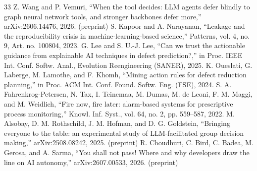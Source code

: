 \documentclass[conference]{IEEEtran}
\begin{document}
\begin{thebibliography}{33}
 Z. Wang and P. Vemuri, ``When the tool decides: LLM agents defer blindly to graph neural network tools, and stronger backbones defer more,'' arXiv:2606.14476, 2026. (preprint)
 S. Kapoor and A. Narayanan, ``Leakage and the reproducibility crisis in machine-learning-based science,'' Patterns, vol. 4, no. 9, Art. no. 100804, 2023.
 G. Lee and S. U.-J. Lee, ``Can we trust the actionable guidance from explainable AI techniques in defect prediction?,'' in Proc. IEEE Int. Conf. Softw. Anal., Evolution Reengineering (SANER), 2025.
 K. Oueslati, G. Laberge, M. Lamothe, and F. Khomh, ``Mining action rules for defect reduction planning,'' in Proc. ACM Int. Conf. Found. Softw. Eng. (FSE), 2024.
 S. A. Fahrenkrog-Petersen, N. Tax, I. Teinemaa, M. Dumas, M. de Leoni, F. M. Maggi, and M. Weidlich, ``Fire now, fire later: alarm-based systems for prescriptive process monitoring,'' Knowl. Inf. Syst., vol. 64, no. 2, pp. 559--587, 2022.
 M. Alsobay, D. M. Rothschild, J. M. Hofman, and D. G. Goldstein, ``Bringing everyone to the table: an experimental study of LLM-facilitated group decision making,'' arXiv:2508.08242, 2025. (preprint)
 R. Choudhuri, C. Bird, C. Badea, M. Gerosa, and A. Sarma, ``You shall not pass! Where and why developers draw the line on AI autonomy,'' arXiv:2607.00533, 2026. (preprint)
\end{thebibliography}
\end{document}
